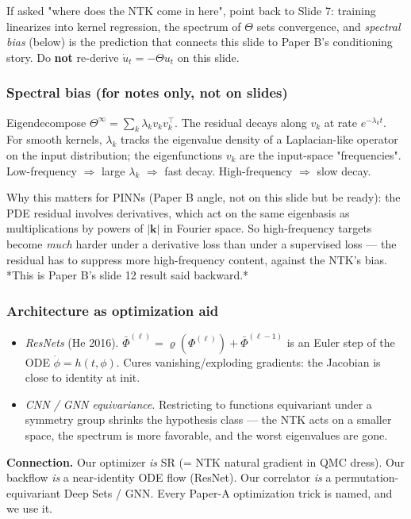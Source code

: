 \documentclass[11pt]{article}
\begin{document}
If asked "where does the NTK come in here", point back to Slide 7: training
linearizes into kernel regression, the spectrum of $\Theta$ sets
convergence, and \emph{spectral bias} (below) is the prediction that connects
this slide to Paper B's conditioning story. Do \textbf{not} re-derive $\dot u_t =
-\Theta u_t$ on this slide.

\subsubsection*{Spectral bias (for notes only, not on slides)}

Eigendecompose $\Theta^\infty = \sum_k \lambda_k v_k v_k^\top$. The
residual decays along $v_k$ at rate $e^{-\lambda_k t}$. For smooth
kernels, $\lambda_k$ tracks the eigenvalue density of a Laplacian-like
operator on the input distribution; the eigenfunctions $v_k$ are the
input-space "frequencies". Low-frequency $\Rightarrow$ large $\lambda_k$
$\Rightarrow$ fast decay. High-frequency $\Rightarrow$ slow decay.

Why this matters for PINNs (Paper B angle, not on this slide but be ready):
the PDE residual involves derivatives, which act on the same eigenbasis as
multiplications by powers of $|\mathbf k|$ in Fourier space. So
high-frequency targets become \emph{much} harder under a derivative loss than
under a supervised loss --- the residual has to suppress more high-frequency
content, against the NTK's bias. *This is Paper B's slide 12 result said
backward.*

\subsubsection*{Architecture as optimization aid}

\begin{itemize}
\item \emph{ResNets} (He 2016). $\bar \Phi^{(\ell)} = \varrho(\Phi^{(\ell)}) +
  \bar \Phi^{(\ell - 1)}$ is an Euler step of the ODE $\dot \phi = h(t,
  \phi)$. Cures vanishing/exploding gradients: the Jacobian is close to
identity at init.
\item \emph{CNN / GNN equivariance}. Restricting to functions equivariant under a
symmetry group shrinks the hypothesis class --- the NTK acts on a smaller
space, the spectrum is more favorable, and the worst eigenvalues are
gone.
\end{itemize}
\textbf{Connection.} Our optimizer \emph{is} SR (= NTK natural gradient in QMC dress).
Our backflow \emph{is} a near-identity ODE flow (ResNet). Our correlator \emph{is} a
permutation-equivariant Deep Sets / GNN. Every Paper-A optimization trick
is named, and we use it.
\end{document}
